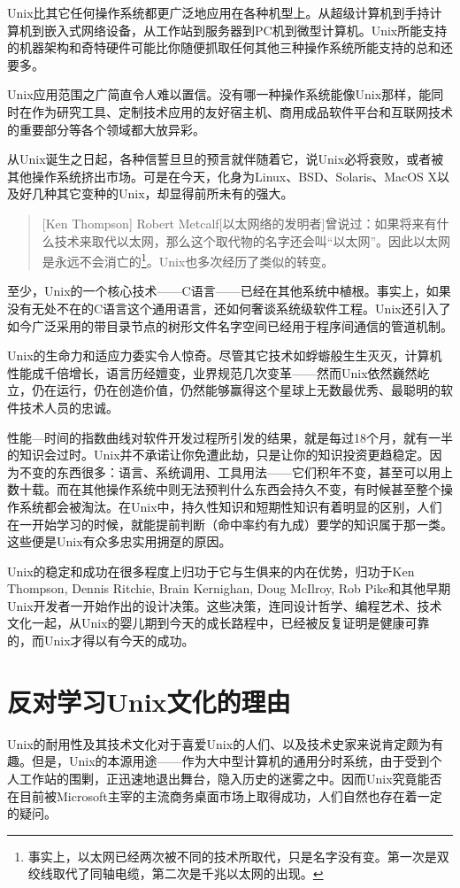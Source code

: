 \documentclass[12pt,oneside]{book}
\begin{document}
Unix比其它任何操作系统都更广泛地应用在各种机型上。从超级计算机到手持计算机到嵌入式网络设备，从工作站到服务器到PC机到微型计算机。Unix所能支持的机器架构和奇特硬件可能比你随便抓取任何其他三种操作系统所能支持的总和还要多。

Unix应用范围之广简直令人难以置信。没有哪一种操作系统能像Unix那样，能同时在作为研究工具、定制技术应用的友好宿主机、商用成品软件平台和互联网技术的重要部分等各个领域都大放异彩。

从Unix诞生之日起，各种信誓旦旦的预言就伴随着它，说Unix必将衰败，或者被其他操作系统挤出市场。可是在今天，化身为Linux、BSD、Solaris、MacOS X以及好几种其它变种的Unix，却显得前所未有的强大。
\begin{quote}[Ken Thompson]
Robert Metcalf[以太网络的发明者]曾说过：如果将来有什么技术来取代以太网，那么这个取代物的名字还会叫“以太网”。因此以太网是永远不会消亡的\footnote{事实上，以太网已经两次被不同的技术所取代，只是名字没有变。第一次是双绞线取代了同轴电缆，第二次是千兆以太网的出现。}。Unix也多次经历了类似的转变。
\end{quote}

至少，Unix的一个核心技术——C语言——已经在其他系统中植根。事实上，如果没有无处不在的C语言这个通用语言，还如何奢谈系统级软件工程。Unix还引入了如今广泛采用的带目录节点的树形文件名字空间已经用于程序间通信的管道机制。

Unix的生命力和适应力委实令人惊奇。尽管其它技术如蜉蝣般生生灭灭，计算机性能成千倍增长，语言历经嬗变，业界规范几次变革——然而Unix依然巍然屹立，仍在运行，仍在创造价值，仍然能够赢得这个星球上无数最优秀、最聪明的软件技术人员的忠诚。

性能—时间的指数曲线对软件开发过程所引发的结果，就是每过18个月，就有一半的知识会过时。Unix并不承诺让你免遭此劫，只是让你的知识投资更趋稳定。因为不变的东西很多：语言、系统调用、工具用法——它们积年不变，甚至可以用上数十载。而在其他操作系统中则无法预判什么东西会持久不变，有时候甚至整个操作系统都会被淘汰。在Unix中，持久性知识和短期性知识有着明显的区别，人们在一开始学习的时候，就能提前判断（命中率约有九成）要学的知识属于那一类。这些便是Unix有众多忠实用拥趸的原因。

Unix的稳定和成功在很多程度上归功于它与生俱来的内在优势，归功于Ken Thompson, Dennis Ritchie, Brain Kernighan, Doug McIlroy, Rob Pike和其他早期Unix开发者一开始作出的设计决策。这些决策，连同设计哲学、编程艺术、技术文化一起，从Unix的婴儿期到今天的成长路程中，已经被反复证明是健康可靠的，而Unix才得以有今天的成功。


\section{反对学习Unix文化的理由}
Unix的耐用性及其技术文化对于喜爱Unix的人们、以及技术史家来说肯定颇为有趣。但是，Unix的本源用途——作为大中型计算机的通用分时系统，由于受到个人工作站的围剿，正迅速地退出舞台，隐入历史的迷雾之中。因而Unix究竟能否在目前被Microsoft主宰的主流商务桌面市场上取得成功，人们自然也存在着一定的疑问。
\end{document}
